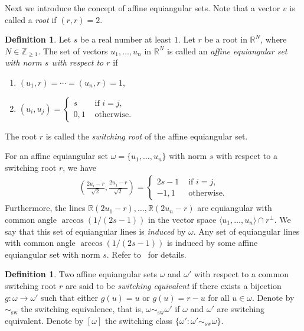 \documentclass[reqno, 11pt]{amsart}
\numberwithin{equation}{section}
\theoremstyle{definition}
\newtheorem{dfn}[lem]{Definition}%
\DeclareMathOperator{\sw}{sw}
\newcommand{\aes}{\omega}
\newcommand{\R}{\mathbb{R}}
\newcommand{\Z}{\mathbb{Z}}
\begin{document}
Next we introduce the concept of affine equiangular sets.
Note that a vector $v$ is called a \emph{root} if $(r,r) = 2$.
\begin{dfn}	\label{dfn:aes}
	Let $s$ be a real number at least $1$.
	Let $r$ be a root in $\R^N$, where $N \in \Z_{\geq 1}$.
	The set of vectors $u_1,\ldots,u_n$ in $\R^N$ is called an \emph{affine equiangular set with norm $s$ with respect to $r$} if
	\begin{enumerate}
		\item $(u_1,r) = \cdots = (u_n,r) = 1$,
		\item $(u_i, u_j) = \begin{cases}
			s   & \text{ if } i = j, \\
			0,1 & \text{ otherwise.}
		\end{cases}$
	\end{enumerate}
	The root $r$ is called the \emph{switching root} of the affine equiangular set.
\end{dfn}


For an affine equiangular set $\aes=\{u_1,\ldots,u_n\}$ with norm $s$ with respect to a switching root $r$, we have
\begin{align*}
	\left(\frac{2u_i - r}{\sqrt{2}}, \frac{2u_j - r}{\sqrt{2}}\right)
	= \begin{cases}
		  2s - 1 & \text{ if } i = j, \\
		  -1,1   & \text{ otherwise.}
	  \end{cases}
\end{align*}
Furthermore, the lines $\R(2u_1-r), \ldots, \R(2u_n-r)$ are equiangular with common angle $\arccos(1/(2s-1))$ in the vector space $\langle u_1,\ldots,u_n \rangle \cap r^\perp$.
We say that this set of equiangular lines is \emph{induced} by $\aes$.
Any set of equiangular lines with common angle $\arccos(1/(2s-1))$ is induced by some affine equiangular set with norm $s$.
Refer to~\cite{cao2022} for details.

\begin{dfn}
	Two affine equiangular sets $\aes$ and $\aes'$ %
	with respect to a common switching root $r$ are said to be \emph{switching equivalent}
	if there exists a bijection $g : \aes \to \aes'$ such that either $g(u) = u$ or $g(u) = r-u$ for all $u \in \aes$.
	Denote by $\sim_{\sw}$ the switching equivalence, that is, $\aes \sim_{\sw} \aes'$ if $\aes$ and $\aes'$ are switching equivalent.
	Denote by $[\aes]$ the switching class $\{ \aes' : \aes' \sim_{\sw} \aes \}$.
\end{dfn}
\end{document}

